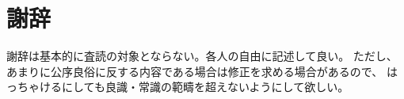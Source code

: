 \chapter{謝辞}
\label{chp:thanks}

謝辞は基本的に査読の対象とならない。各人の自由に記述して良い。
ただし、あまりに公序良俗に反する内容である場合は修正を求める場合があるので、
はっちゃけるにしても良識・常識の範疇を超えないようにして欲しい。
